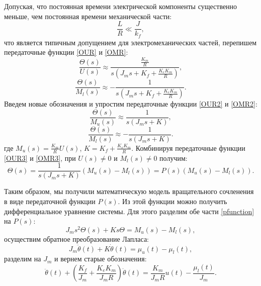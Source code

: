 Допуская, что постоянная времени электрической компоненты существенно меньше, чем постоянная времени механической части:
\begin{equation}
	\frac{L}{R}\ll\frac{J}{k_f},
\end{equation}
что является типичным допущением для электромеханических частей, перепишем передаточные функции \eqref{OUR} и \eqref{OMR}:
\begin{equation}\label{OUR2}
	\frac{\Theta(s)}{U(s)}\approx\frac{\frac{K_m}{R}}{s(J_ms+K_f+\frac{K_eK_m}{R})},
\end{equation}
\begin{equation}\label{OMR2}
	\frac{\Theta(s)}{M_l(s)}\approx-\frac{1}{s(J_ms+K_f+\frac{K_eK_m}{R})}.
\end{equation}
Введем новые обозначения и упростим передаточные функции \eqref{OUR2} и \eqref{OMR2}:
\begin{equation}\label{OUR3}
	\frac{\Theta(s)}{M_u(s)}\approx\frac{1}{s(J_ms+K)},
\end{equation}
\begin{equation}\label{OMR3}
	\frac{\Theta(s)}{M_l(s)}\approx-\frac{1}{s(J_ms+K)}.
\end{equation}
где $M_u(s)= \frac{K_m}{R}U(s)$, $K=K_f+\frac{K_eK_m}{R}$.
Комбинируя передаточные функции \eqref{OUR3} и \eqref{OMR3}, при $U(s)\neq0$ и $M_l(s)\neq0$ получим:
\begin{equation}\label{pfunction}
	\Theta(s)=\frac{1}{s(J_ms+K)}(M_u(s)-M_l(s))=P(s)(M_u(s)-M_l(s)).
\end{equation}

Таким образом, мы получили математическую модель вращательного сочленения в виде передаточной функции $P(s)$. Из этой функции можно получить дифференциальное уравнение системы. Для этого разделим обе части \eqref{pfunction} на $P(s)$:
\begin{equation}
	J_ms^2\Theta(s)+Ks\Theta=M_u(s)-M_l(s),
\end{equation}
осуществим обратное преобразование Лапласа:
\begin{equation}
	J_m\ddot{\theta}(t)+K\dot{\theta}(t)=\mu_u(t)-\mu_l(t),
\end{equation}
разделим на $J_m$ и вернем старые обозначения:
\begin{equation}\label{dif}
	\ddot{\theta}(t)+(\frac{K_f}{J_m}+\frac{K_eK_m}{J_mR})\dot{\theta}(t)=\frac{K_m}{J_mR}u(t)-\frac{\mu_l(t)}{J_m}.
\end{equation}